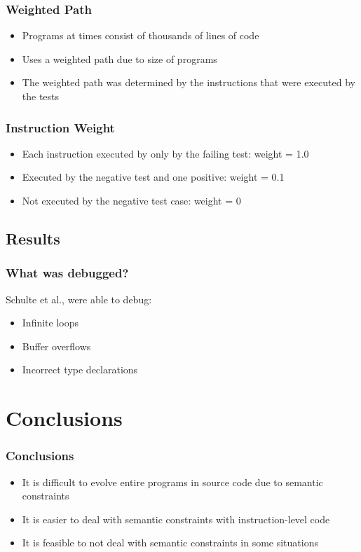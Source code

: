 \documentclass{beamer}
\begin{document}
\begin{frame}
\frametitle{Weighted Path}
\begin{itemize}

   \item Programs at times consist of thousands of lines of code  
   \item Uses a weighted path due to size of programs
   \item The weighted path was determined by the instructions that were executed by the tests
   \end{itemize}
\end{frame}


\begin{frame}
  \frametitle{Instruction Weight}
  
    \begin{itemize}
  	\item Each instruction executed by only by the failing test: weight = 1.0
  	\item Executed by the negative test and one positive: weight = 0.1
  	\item Not executed by the negative test case: weight = 0
  \end{itemize}
\end{frame}

\subsection[Results]{Results}

\begin{frame}
\frametitle{What was debugged?}
Schulte et al., were able to debug:
\begin{itemize}
\item Infinite loops
\item Buffer overflows
\item Incorrect type declarations

\end{itemize}


\end{frame}




\section[Conclusions]{Conclusions}

\begin{frame}
\frametitle{Conclusions}
\begin{itemize}
\item It is difficult to evolve entire programs in source code due to semantic constraints
\item It is easier to deal with semantic constraints with instruction-level code
\item It is feasible to not deal with semantic constraints in some situations

\end{itemize}

\end{frame}
\end{document}
